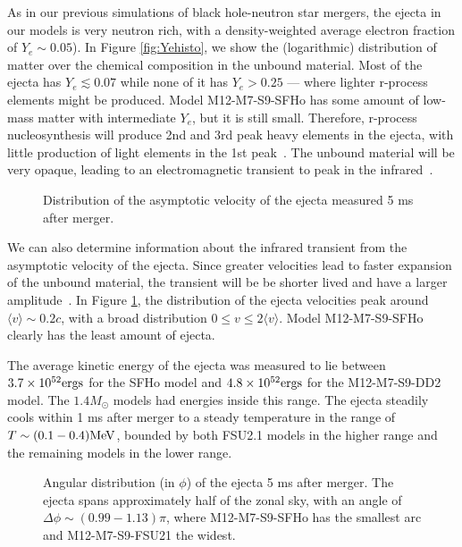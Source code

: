 As in our previous simulations of black hole-neutron star mergers, the ejecta in our models is very neutron rich, with a density-weighted average electron fraction of $Y_e \sim 0.05$).  
In Figure \ref{fig:Yehisto}, we show the (logarithmic) distribution of matter over the chemical composition in the unbound material.  
Most of the ejecta has $Y_e \lesssim 0.07$ while none of it has $Y_e > 0.25$ --- where lighter r-process elements might be produced.  
Model M12-M7-S9-SFHo has some amount of low-mass matter with intermediate $Y_e$, but it is still small. 
Therefore, r-process nucleosynthesis will produce 2nd and 3rd peak heavy elements in the ejecta, with little production of light elements in the 1st peak~\cite{Lippuner2015}.  
The unbound material will be very opaque, leading to an electromagnetic transient to peak in the infrared~\cite{2013ApJ...775...18B}.

\begin{figure}
	\centering
	
	\caption[Distribution of the asymptotic velocity of the ejecta]{
		Distribution of the asymptotic velocity of the ejecta measured 5 ms after merger.
	}
	\label{fig:vrhisto}
\end{figure}

We can also determine information about the infrared transient from the asymptotic velocity of the ejecta.  
Since greater velocities lead to faster expansion of the unbound material, the transient will be be shorter lived and have a larger amplitude~\cite{2013ApJ...775...18B,Barnes:2016}. 
In Figure \ref{fig:vrhisto}, the distribution of the ejecta velocities peak around $\langle v \rangle \sim 0.2 c$, with a broad distribution  $ 0 \le v \le 2 \langle v \rangle $.
Model M12-M7-S9-SFHo clearly has the least amount of ejecta.

The average kinetic energy of the ejecta was measured to lie between $3.7 \times 10^{52} {\rm ergs} $ for the SFHo model and $4.8 \times 10^{52} {\rm ergs} $ for the M12-M7-S9-DD2 model.  
The $1.4 M_\odot$ models had energies inside this range. 
The ejecta steadily cools within 1 ms after merger to a steady temperature in the range of $T \sim (0.1 - 0.4) {\rm MeV}$, bounded by both FSU2.1 models in the higher range and the remaining models in the lower range.

\begin{figure}
	\centering
	
	\caption[Angular distribution (in $\phi$) of the ejecta]{
		Angular distribution (in $\phi$) of the ejecta 5 ms after merger.  The ejecta spans approximately half of the zonal sky, with an angle of $\Delta \phi \sim (0.99-1.13) \pi$, where M12-M7-S9-SFHo has the smallest arc and M12-M7-S9-FSU21 the widest.
	}
	\label{fig:phihisto}
\end{figure}

